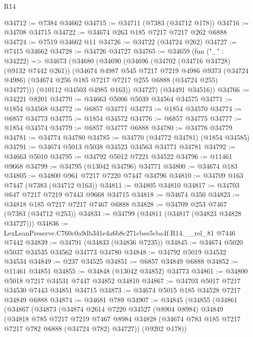 \begin{lexlean}{R14}
\begin{coremodule}
@34712 := @7384 @34662
@34715 := @34711 (@7383 (@34712 @178))
@34716 := @34708 @34715
@34722 := @34674 @263 @185 @7217 @7217 @262 @6888
@34724 := @7519 @34662 @11
@34726 := @34722 (@34724 @262)
@34727 := @7415 @34662
@34728 := @34726 @34727
@34765 := @34659
    (fun ("_" : @34222) =>
    @34673
      (@34680
        (@34690
          (@34696
            (@34702 (@34716 @34728) (@9132 @7442 @261))
            (@34674
              @4987
              @545
              @7217
              @7219
              @4986
              @9373
              (@34724 @4986)
              (@34674 @256 @185 @7217 @7217 @255 @6888 (@34724 @255) @34727)))
          (@10112 @34503 @4985 @163))
        @34727)
      (@34491 @34516))
@34766 := @34221 @8201
@34770 := @34663 @5006 @5039 @34564 @34575
@34771 := @1854 @34568
@34772 := @6857 @34771
@34773 := @1854 @34570
@34774 := @6857 @34773
@34775 := @1854 @34572
@34776 := @6857 @34775
@34777 := @1854 @34574
@34779 := @6857 @34777 @6888
@34780 := @34776 @34779
@34781 := @34774 @34780
@34785 := @34770 (@34772 @34781) (@1854 @34585)
@34791 := @34674 @5013 @5038 @34523 @34563 @34771 @34781
@34792 := @34663 @5010
@34795 := @34792 @5012 @7221 @34522
@34796 := @11461 @9668
@34799 := @34795 (@13042 @34796) @34771
@34800 := @34674 @183
@34805 := @34800 @961 @7217 @7220 @7447 @34796
@34810 := @34709 @163 @7447 (@7383 (@34712 @163))
@34811 := @34805 @34810
@34817 := @34703 @647 @7217 @7219 @7443 @9668 @34715
@34818 := @34674 @350
@34823 := @34818 @185 @7217 @7217 @7467 @6888
@34828 := @34709 @253 @7467 (@7383 (@34712 @253))
@34833 := @34799 (@34811 (@34817 (@34823 @34828 @34727)))
@34836 := LexLeanPreserve.C760c0a9db341e4a6b8c271cbee5cba4f.R14.__rel_81 @7446 @7442
@34839 := @34791 (@34833 (@34836 @7235))
@34845 := @34674 @5020 @5037 @34535 @34562 @34773 @34780
@34848 := @34792 @5019 @34532 @34534
@34849 := @237 @34525
@34851 := @6857 @34849 @6888
@34852 := @11461 @34851
@34855 := @34848 (@13042 @34852) @34773
@34861 := @34800 @5018 @7217 @34531 @7447 @34852 @34810
@34867 := @34703 @5017 @7217 @34530 @7443 @34851 @34715
@34873 := @34674 @5015 @185 @34528 @7217 @34849 @6888
@34874 := @34681 @789
@34907 := @34845
    (@34855
      (@34861
        (@34867
          (@34873
            (@34874
              @2614
              @7220
              @34527
              (@8904 @8984)
              @34849
              (@34818
                @785
                @7217
                @7219
                @7467
                @8984
                @34828
                (@34674 @783 @185 @7217 @7217 @782 @6888 (@34724 @782) @34727))
              (@9202 @178))

\end{coremodule}
\end{lexlean}
